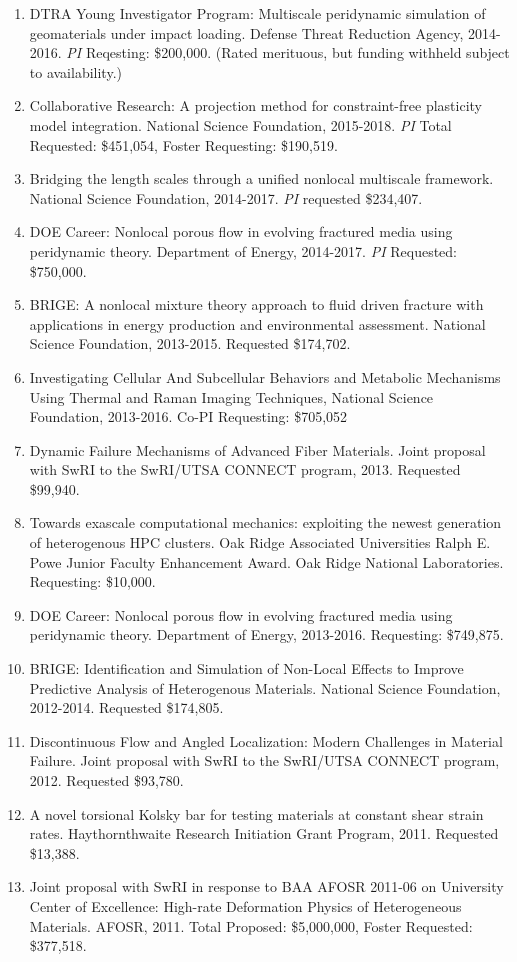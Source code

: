 \begin{enumerate}
  \item DTRA Young Investigator Program: Multiscale peridynamic simulation of geomaterials under impact loading. Defense Threat Reduction Agency, 2014-2016. \textit{PI} Reqesting: \$200,000. (Rated merituous, but funding withheld subject to availability.)
  \item Collaborative Research: A projection method for constraint-free plasticity model integration. National Science Foundation, 2015-2018. \textit{PI} Total Requested: \$451,054, Foster Requesting: \$190,519.
    \item Bridging the length scales through a unified nonlocal multiscale framework. National Science Foundation, 2014-2017. \textit{PI} requested \$234,407.
    \item DOE Career: Nonlocal porous flow in evolving fractured media using peridynamic theory. Department of Energy, 2014-2017. \textit{PI} Requested: \$750,000. 
    \item BRIGE: A nonlocal mixture theory approach to fluid driven fracture with applications in energy production and environmental assessment. National Science Foundation, 2013-2015. Requested \$174,702.
    \item  Investigating Cellular And Subcellular Behaviors and Metabolic Mechanisms Using Thermal and Raman Imaging Techniques, National Science Foundation, 2013-2016.  Co-PI Requesting: \$705,052
    \item Dynamic Failure Mechanisms of Advanced Fiber Materials. Joint proposal with SwRI to the SwRI/UTSA CONNECT program, 2013. Requested \$99,940.
    \item Towards exascale computational mechanics: exploiting the newest generation of heterogenous HPC clusters. Oak Ridge Associated Universities Ralph E. Powe Junior Faculty Enhancement Award. Oak Ridge National Laboratories. Requesting: \$10,000. 
    \item DOE Career: Nonlocal porous flow in evolving fractured media using peridynamic theory. Department of Energy, 2013-2016. Requesting: \$749,875. 
    \item BRIGE: Identification and Simulation of Non-Local Effects to Improve Predictive Analysis of Heterogenous Materials. National Science Foundation, 2012-2014. Requested \$174,805.
    \item Discontinuous Flow and Angled Localization: Modern Challenges in Material Failure. Joint proposal with SwRI to the SwRI/UTSA CONNECT program, 2012. Requested \$93,780.
    \item A novel torsional Kolsky bar for testing materials at constant shear strain rates. Haythornthwaite Research Initiation Grant Program, 2011. Requested \$13,388.
    \item Joint proposal with SwRI in response to BAA AFOSR 2011-06 on University Center of Excellence: High-rate Deformation Physics of Heterogeneous Materials. AFOSR, 2011. Total Proposed: \$5,000,000, Foster Requested: \$377,518.
\end{enumerate}
